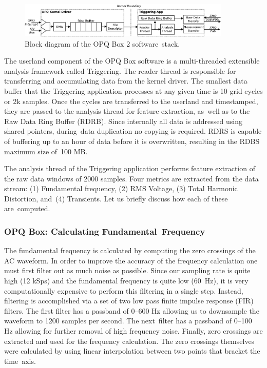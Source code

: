 \documentclass[energies,article,accept,moreauthors,pdftex]{Definitions/mdpi}
\begin{document}
\begin{figure}[H]
\begin{center}
\includegraphics[width=0.9\textwidth]{images/opq-box/opqbox_software.png}
\end{center}
\caption{Block diagram of the OPQ Box 2 software~stack.}
\label{fig:opq:3}
\end{figure}

The userland component of the OPQ Box software is a multi-threaded extensible analysis framework called Triggering.
The reader thread is responsible for transferring and accumulating data from the kernel driver.
The smallest data buffer that the Triggering application processes at any given time is 10 grid cycles or 2k samples.
Once the cycles are transferred to the userland and timestamped, they are passed to the analysis thread for feature extraction, as~well as to the Raw Data Ring Buffer (RDRB).
Since internally all data is addressed using shared pointers, during~data duplication no copying is required.
RDRS is capable of buffering up to an hour of data before it is overwritten, resulting in the RDBS maximum size of~100 MB.

The analysis thread of the Triggering application performs feature extraction of the raw data windows of 2000 samples.
Four metrics are extracted from the data stream: (1) Fundamental frequency, (2) RMS Voltage, (3) Total Harmonic Distortion, and~(4) Transients. Let us briefly discuss how each of these are~computed.

\subsubsection{OPQ Box: Calculating Fundamental~Frequency}\label{subsec:fundamental-frequency}

The fundamental frequency is calculated by computing the zero crossings of the AC waveform.
In order to improve the accuracy of the frequency calculation one must first filter out as much noise as possible.
Since our sampling rate is quite high (12 kSps) and the fundamental frequency is quite low (60~Hz), it is very computationally expensive to perform this filtering in a single step.
Instead, filtering is accomplished via a set of two low pass finite impulse response (FIR) filters.
The first filter has a passband of 0--600 Hz allowing us to downsample the waveform to 1200 samples per second.
The next~filter has a passband of 0--100 Hz allowing for further removal of high frequency noise.
Finally, zero crossings are extracted and used for the frequency calculation.
The zero crossings themselves were calculated by using linear interpolation between two points that bracket the time~axis.
\end{document}
